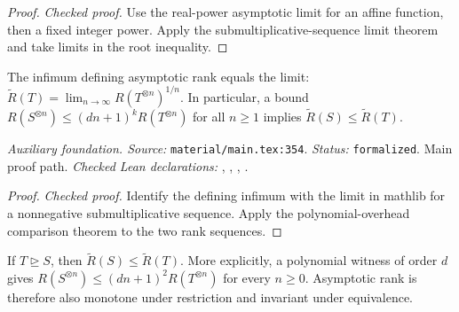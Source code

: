 \begin{proof}
\leanok
\textit{Checked proof.} Use the real-power asymptotic limit for an affine function, then a fixed integer power. Apply the submultiplicative-sequence limit theorem and take limits in the root inequality.
\end{proof}

\renewcommand{\thetheorem}{A31}
\begin{lemma}
\label{aux:asymptotic-rank-limit}
\leanok
The infimum defining asymptotic rank equals the limit: $\widetilde R(T)=\lim_{n\to\infty}R(T^{\otimes n})^{1/n}$. In particular, a bound $R(S^{\otimes n})\le(dn+1)^kR(T^{\otimes n})$ for all $n\ge1$ implies $\widetilde R(S)\le\widetilde R(T)$.
\end{lemma}

\noindent\textit{Auxiliary foundation. Source:} \texttt{material/main.tex:354}.
\textit{Status:} \texttt{formalized}. Main proof path.
\textit{Checked Lean declarations:} , , , .

\begin{proof}
\leanok
{}
\textit{Checked proof.} Identify the defining infimum with the limit in mathlib for a nonnegative submultiplicative sequence. Apply the polynomial-overhead comparison theorem to the two rank sequences.
\end{proof}

\renewcommand{\thetheorem}{A32}
\begin{lemma}
\label{aux:asymptotic-rank-degeneration}
\manuscriptproof
{}
\leanok
If $T\trianglerighteq S$, then $\widetilde R(S)\le\widetilde R(T)$. More explicitly, a polynomial witness of order $d$ gives $R(S^{\otimes n})\le(dn+1)^2R(T^{\otimes n})$ for every $n\ge0$. Asymptotic rank is therefore also monotone under restriction and invariant under equivalence.
\end{lemma}

